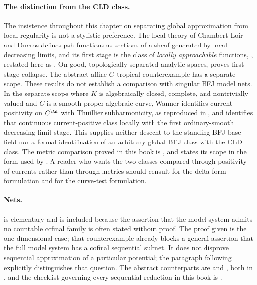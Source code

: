 \paragraph{The distinction from the CLD class.}
The insistence throughout this chapter on separating global approximation
from local regularity is not a stylistic preference.  The local theory of
Chambert-Loir and Ducros \cite{CLD25} defines psh functions as sections of a
sheaf generated by local decreasing limits, and its first stage is the class
of \emph{locally approachable} functions,
\cite[Definition~8.1.13]{CLD25}, restated here as
.  On good, topologically separated
analytic spaces,  proves
first-stage collapse.  The abstract affine $G$-tropical counterexample
 has a separate scope.
These results do not establish a comparison with singular BFJ model nets.  In the separate scope where $K$ is
algebraically closed, complete, and nontrivially valued and $C$ is a smooth
proper algebraic curve, Wanner \cite{Wanner19} identifies current positivity
on $C^{\An}$ with Thuillier subharmonicity, as reproduced in
, and
 identifies that
continuous current-positive class locally with the first ordinary-smooth
decreasing-limit stage.  This supplies neither descent to the standing BFJ
base field nor a formal identification of an arbitrary global BFJ class with
the CLD class.  The metric comparison proved in this book is
, and
 states its scope in the form used by
.  A reader who wants the two classes compared through
positivity of currents rather than through metrics should consult
\cite{GK17,GK19} for the delta-form formulation and
\cite{GR25Classical,GR25PL} for the curve-test formulation.

\paragraph{Nets.}
 is elementary and is included because
the assertion that the model system admits no countable cofinal family is
often stated without proof.  The proof given is the one-dimensional case;
that counterexample already blocks a general assertion that the full
model system has a cofinal sequential subnet.  It does not disprove
sequential approximation of a particular potential; the paragraph following
\cite[Theorem~8.7]{BFJ16} explicitly distinguishes that question.  The abstract counterparts are
 and
, both in
, and the checklist governing every sequential
reduction in this book is .

